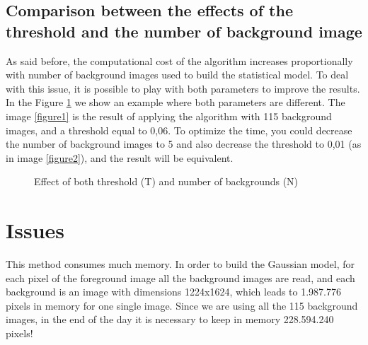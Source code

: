 \documentclass{article}
\begin{document}
\subsection{Comparison between the effects of the threshold and the number of background image}
	As said before, the computational cost of the algorithm increases proportionally with number of background images used to build the statistical model. To deal with this issue, it is possible to play with both parameters to improve the results. In the Figure \ref{thresxback} we show an example where both parameters are different. The image \ref{figure1} is the result of applying the algorithm with 115 background images, and a threshold equal to 0,06. To optimize the time, you could decrease the number of background images to 5 and also decrease the threshold to 0,01 (as in image \ref{figure2}), and the result will be equivalent.

	\begin{figure}[H]
		  \centering
		  \caption{Effect of both threshold (T) and number of backgrounds (N)}
		  \label{thresxback}
	\end{figure}
	
\section{Issues}
	This method consumes much memory. In order to build the Gaussian model, for each pixel of the foreground image all the background images are read, and each background is an image with dimensions 1224x1624, which leads to 1.987.776 pixels in memory for one single image. Since we are using all the 115 background images, in the end of the day it is necessary to keep in memory 228.594.240 pixels!
\end{document}
